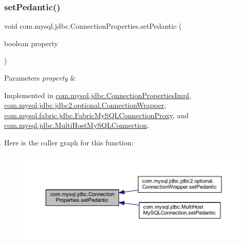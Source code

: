 \subsubsection{\texorpdfstring{set\+Pedantic()}{setPedantic()}}
{\footnotesize\ttfamily void com.\+mysql.\+jdbc.\+Connection\+Properties.\+set\+Pedantic (\begin{DoxyParamCaption}\item[{boolean}]{property }\end{DoxyParamCaption})}


\begin{DoxyParams}{Parameters}
{\em property} & \\
\hline
\end{DoxyParams}


Implemented in \mbox{\hyperlink{classcom_1_1mysql_1_1jdbc_1_1_connection_properties_impl_ad7ae4a320df7a8e5dc59507595393acf}{com.\+mysql.\+jdbc.\+Connection\+Properties\+Impl}}, \mbox{\hyperlink{classcom_1_1mysql_1_1jdbc_1_1jdbc2_1_1optional_1_1_connection_wrapper_a1c2af9306775ec3517e4aee8de864380}{com.\+mysql.\+jdbc.\+jdbc2.\+optional.\+Connection\+Wrapper}}, \mbox{\hyperlink{classcom_1_1mysql_1_1fabric_1_1jdbc_1_1_fabric_my_s_q_l_connection_proxy_a48c0e82fdcea0d378436b44c8e7d5fd9}{com.\+mysql.\+fabric.\+jdbc.\+Fabric\+My\+S\+Q\+L\+Connection\+Proxy}}, and \mbox{\hyperlink{classcom_1_1mysql_1_1jdbc_1_1_multi_host_my_s_q_l_connection_a9e6d76a788879ee7f45d6407d89a63c0}{com.\+mysql.\+jdbc.\+Multi\+Host\+My\+S\+Q\+L\+Connection}}.

Here is the caller graph for this function\+:\nopagebreak
\begin{figure}[H]
\begin{center}
\leavevmode
\includegraphics[width=350pt]{interfacecom_1_1mysql_1_1jdbc_1_1_connection_properties_acc7191665477c54523bc25845278b99f_icgraph}
\end{center}
\end{figure}
\mbox{\label{interfacecom_1_1mysql_1_1jdbc_1_1_connection_properties_ad65dad2e98f66f1b4a8d1aff24cbc2d5}} 
